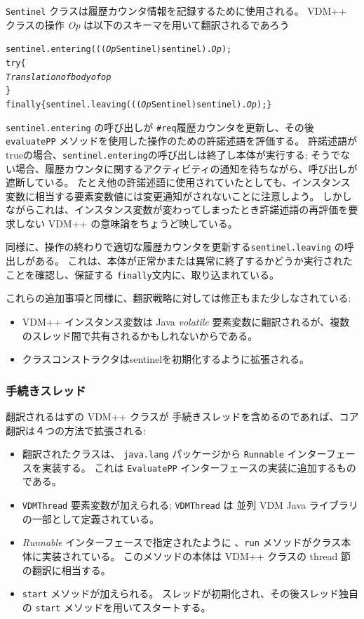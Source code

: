 \documentclass[\pformat,11pt]{jarticle}
\newcommand{\VDM}{VDM++}
\newcommand{\CJL}{並列 VDM Java ライブラリ}
\begin{document}
 \texttt{Sentinel} クラスは履歴カウンタ情報を記録するために使用される。
 \VDM{} クラスの操作 \textit{Op} は以下のスキーマを用いて翻訳されるであろう
\begin{alltt}
    sentinel.entering(((\textit{Op}Sentinel) sentinel).\textit{Op});
    try \{
      \textit{Translation of body of op}
    \}
    finally \{ sentinel.leaving(((\textit{Op}Sentinel) sentinel).\textit{Op});\}
\end{alltt}
 \texttt{sentinel.entering} の呼び出しが \texttt{\#req}履歴カウンタを更新し、その後 \texttt{evaluatePP} メソッドを使用した操作のための許諾述語を評価する。
許諾述語が trueの場合、\texttt{sentinel.entering}の呼び出しは終了し本体が実行する; そうでない場合、履歴カウンタに関するアクティビティの通知を待ちながら、呼び出しが遮断している。
たとえ他の許諾述語に使用されていたとしても、インスタンス変数に相当する要素変数値には変更通知がされないことに注意しよう。
しかしながらこれは、インスタンス変数が変わってしまったとき許諾述語の再評価を要求しない \VDM{} の意味論をちょうど映している。

同様に、操作の終わりで適切な履歴カウンタを更新する\texttt{sentinel.leaving} の呼出しがある。
これは、本体が正常かまたは異常に終了するかどうか実行されたことを確認し、保証する \texttt{finally}文内に、取り込まれている。

これらの追加事項と同様に、翻訳戦略に対しては修正もまた少しなされている:
\begin{itemize}
\item \VDM{} インスタンス変数は Java \textit{volatile} 要素変数に翻訳されるが、複数のスレッド間で共有されるかもしれないからである。
\item クラスコンストラクタはsentinelを初期化するように拡張される。
\end{itemize}

\subsubsection{手続きスレッド}

翻訳されるはずの \VDM{} クラスが 手続きスレッドを含めるのであれば、コア翻訳は４つの方法で拡張される: 
\begin{itemize}
\item 翻訳されたクラスは、 \texttt{java.lang} パッケージから \texttt{Runnable} インターフェースを実装する。
これは \texttt{EvaluatePP} インターフェースの実装に追加するものである。
\item  \texttt{VDMThread} 要素変数が加えられる; \texttt{VDMThread} は \CJL の一部として定義されている。
\item  \textit{Runnable} インターフェースで指定されたように 、\texttt{run} メソッドがクラス本体に実装されている。
このメソッドの本体は  \VDM{} クラスの \textsf{thread} 節の翻訳に相当する。
\item \texttt{start} メソッドが加えられる。
スレッドが初期化され、その後スレッド独自の \texttt{start} メソッドを用いてスタートする。
\end{itemize}
\end{document}
